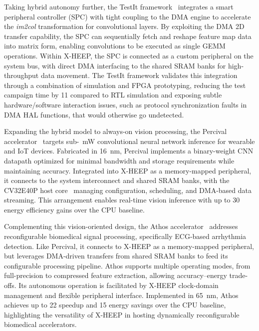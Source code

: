                 Taking hybrid autonomy further, the TestIt framework~\cite{dma} integrates a smart peripheral controller (SPC) with tight coupling to the DMA engine to accelerate the \textit{im2col} transformation for convolutional layers. By exploiting the DMA 2D transfer capability, the SPC can sequentially fetch and reshape feature map data into matrix form, enabling convolutions to be executed as single GEMM operations. Within \mbox{X-HEEP}, the SPC is connected as a custom peripheral on the system bus, with direct DMA interfacing to the shared SRAM banks for high-throughput data movement. The TestIt framework validates this integration through a combination of simulation and FPGA prototyping, reducing the test campaign time by \SI{11}{\times} compared to RTL simulation and exposing subtle hardware/software interaction issues, such as protocol synchronization faults in DMA HAL functions, that would otherwise go undetected.
                
                Expanding the hybrid model to always-on vision processing, the Percival accelerator~\cite{percival} targets sub-\SI{}{\milli\watt} convolutional neural network inference for wearable and IoT devices. Fabricated in \SI{16}{\nano\meter}, Percival implements a binary-weight CNN datapath optimized for minimal bandwidth and storage requirements while maintaining accuracy. Integrated into \mbox{X-HEEP} as a memory-mapped peripheral, it connects to the system interconnect and shared SRAM banks, with the CV32E40P host core~\cite{ri5cy} managing configuration, scheduling, and DMA-based data streaming. This arrangement enables real-time vision inference with up to \SI{30}{\times} energy efficiency gains over the CPU baseline.
                
                Complementing this vision-oriented design, the Athos accelerator~\cite{athos} addresses reconfigurable biomedical signal processing, specifically ECG-based arrhythmia detection. Like Percival, it connects to \mbox{X-HEEP} as a memory-mapped peripheral, but leverages DMA-driven transfers from shared SRAM banks to feed its configurable processing pipeline. Athos supports multiple operating modes, from full-precision to compressed feature extraction, allowing accuracy–energy trade-offs. Its autonomous operation is facilitated by \mbox{X-HEEP} clock-domain management and flexible peripheral interface. Implemented in \SI{65}{\nano\meter}, Athos achieves up to \SI{22}{\times} speedup and \SI{15}{\times} energy savings over the CPU baseline, highlighting the versatility of \mbox{X-HEEP} in hosting dynamically reconfigurable biomedical accelerators.
            
